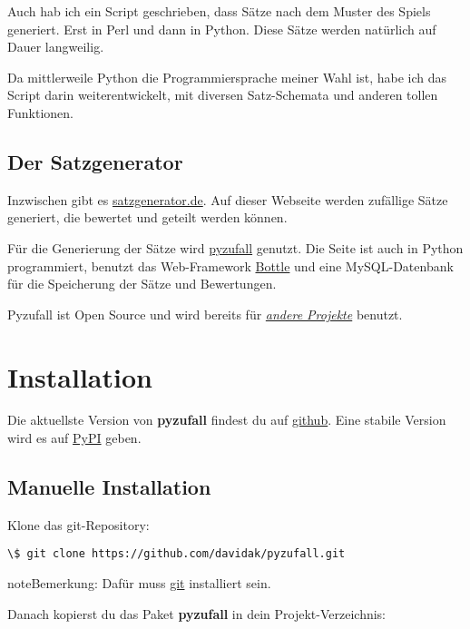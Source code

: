 \documentclass[a4paper,12pt,oneside]{sphinxmanual}
\begin{document}
Auch hab ich ein Script geschrieben, dass Sätze nach dem Muster des Spiels generiert. Erst in Perl und dann in Python. Diese Sätze werden natürlich auf Dauer langweilig.

Da mittlerweile Python die Programmiersprache meiner Wahl ist, habe ich das Script darin weiterentwickelt, mit diversen Satz-Schemata und anderen tollen Funktionen.


\section{Der Satzgenerator}
\label{entstehung:der-satzgenerator}
Inzwischen gibt es \href{http://satzgenerator.de/}{satzgenerator.de}. Auf dieser Webseite werden zufällige Sätze generiert, die bewertet und geteilt werden können.

Für die Generierung der Sätze wird \href{https://github.com/davidak/pyzufall}{pyzufall} genutzt. Die Seite ist auch in Python programmiert, benutzt das Web-Framework \href{http://bottlepy.org/}{Bottle} und eine MySQL-Datenbank für die Speicherung der Sätze und Bewertungen.

Pyzufall ist Open Source und wird bereits für {\hyperref[benutzer::doc]{\emph{andere Projekte}}} benutzt.


\chapter{Installation}
\label{installation:installation}\label{installation::doc}
Die aktuellste Version von \textbf{pyzufall} findest du auf \href{https://github.com/davidak/pyzufall}{github}. Eine stabile Version wird es auf \href{https://pypi.python.org/}{PyPI} geben.


\section{Manuelle Installation}
\label{installation:manuelle-installation}
Klone das git-Repository:

\begin{Verbatim}[commandchars=\\\{\}]
\$ git clone https://github.com/davidak/pyzufall.git
\end{Verbatim}

\begin{notice}{note}{Bemerkung:}
Dafür muss \href{http://git-scm.com/}{git} installiert sein.
\end{notice}

Danach kopierst du das Paket \textbf{pyzufall} in dein Projekt-Verzeichnis:
\end{document}

